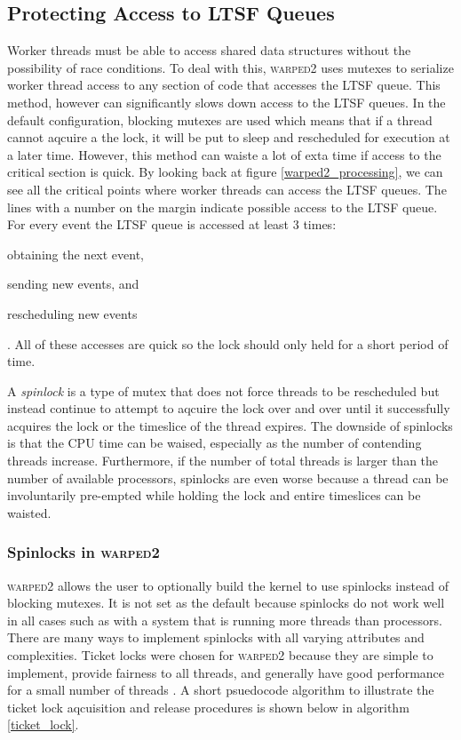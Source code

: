 \documentclass[11pt]{book}
\begin{document}
\subsection{Protecting Access to LTSF Queues}

Worker threads must be able to access shared data structures without the possibility of
race conditions. To deal with this, \textsc{warped2} uses mutexes to serialize worker thread
access to any section of code that accesses the LTSF queue. This method, however can significantly
slows down access to the LTSF queues. In the default configuration, blocking mutexes are used
which means that if a thread cannot aqcuire a the lock, it will be put to sleep and rescheduled
for execution at a later time. However, this method can waiste a lot of exta time if access to the
critical section is quick. By looking back at figure \ref{warped2_processing}, we can see all
the critical points where worker threads can access the LTSF queues. The lines with a number on
the margin indicate possible access to the LTSF queue. For every event the LTSF queue is accessed
at least 3 times: \begin{inparaenum}[(1)] \item obtaining the next event, \item sending new
events, and \item rescheduling new events \end{inparaenum}. All of these accesses are quick so
the lock should only held for a short period of time.

A \emph{spinlock} is a type of mutex that does not force threads to be rescheduled but
instead continue to attempt to aqcuire the lock over and over until it successfully acquires
the lock or the timeslice of the thread expires. The downside of spinlocks is that the CPU time
can be waised, especially as the number of contending threads increase. Furthermore, if the
number of total threads is larger than the number of available processors, spinlocks are
even worse because a thread can be involuntarily pre-empted while holding the lock and entire
timeslices can be waisted.

\subsubsection{Spinlocks in \textsc{warped2}}

\textsc{warped2} allows the user to optionally build the kernel to use spinlocks instead of
blocking mutexes. It is not set as the default because spinlocks do not work well in all cases
such as with a system that is running more threads than processors.
There are many ways to implement spinlocks with all varying attributes and complexities.
Ticket locks were chosen for \textsc{warped2} because they are simple to implement, provide
fairness to all threads, and generally have good performance for a small number of threads
\cite{lockless-10}. A short psuedocode algorithm to illustrate the ticket lock aqcuisition and
release procedures is shown below in algorithm \ref{ticket_lock}.
\end{document}
